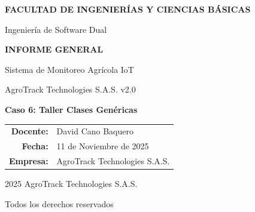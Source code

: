 \documentclass[12pt,a4paper]{article}
\begin{document}

\begin{titlepage}
    \centering
    \vspace*{2cm}
    
    {\LARGE\bfseries FACULTAD DE INGENIERÍAS Y CIENCIAS BÁSICAS\par}
    \vspace{0.5cm}
    {\Large Ingeniería de Software Dual\par}
    \vspace{2cm}
    
    {\Huge\bfseries\color{agrogreen} INFORME GENERAL\par}
    \vspace{0.5cm}
    {\huge Sistema de Monitoreo Agrícola IoT\par}
    \vspace{0.3cm}
    {\LARGE AgroTrack Technologies S.A.S. v2.0\par}
    \vspace{2cm}
    
    \begin{tcolorbox}[colback=agrogreen!10,colframe=agrogreen,width=0.8\textwidth]
        \centering
        {\Large\bfseries Caso 6: Taller Clases Genéricas}
    \end{tcolorbox}
    
    \vspace{2cm}
    
    \begin{tabular}{rl}
        \textbf{Docente:} & David Cano Baquero \\
        \textbf{Fecha:} & 11 de Noviembre de 2025 \\
        \textbf{Empresa:} & AgroTrack Technologies S.A.S. \\
    \end{tabular}
    
    \vfill
    
    {\large\textcopyright{} 2025 AgroTrack Technologies S.A.S.\par}
    {\small Todos los derechos reservados\par}
\end{titlepage}

\setcounter{page}{1}

\end{document}
